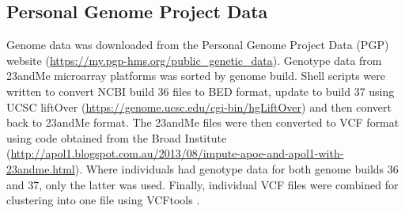 \documentclass{bmcart}
\begin{document}
\subsection*{Personal Genome Project Data}
Genome data was downloaded from the Personal Genome Project Data (PGP) website (\url{https://my.pgp-hms.org/public_genetic_data}). Genotype data from 23andMe microarray platforms was sorted by genome 
build. Shell scripts were written to convert NCBI build 36 files to BED format, update to build 37 using UCSC liftOver (\url{https://genome.ucsc.edu/cgi-bin/hgLiftOver}) and 
then convert back to 23andMe format. The 23andMe files were then converted to VCF format using code obtained from the Broad Institute (\url{http://apol1.blogspot.com.au/2013/08/impute-apoe-and-apol1-with-23andme.html}). 
Where individuals had genotype data for both genome builds 36 and 37, only the latter was used. Finally, individual VCF files were combined for clustering into one 
file using VCFtools \cite{Danecek2011Variant}.


\end{document}
